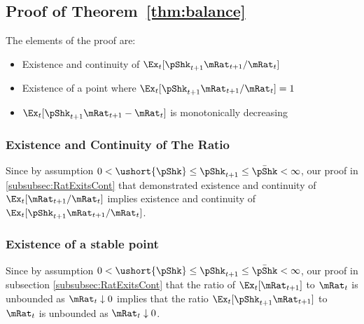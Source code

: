 \documentclass[\econtexRoot/BufferStockTheory]{subfiles}
\begin{document}
  
\subsection{Proof of Theorem~\ref{thm:balance}}

The elements of the proof are:
\begin{itemize}
\item Existence and continuity of $\Ex_{t}[\pShk_{t+1}\mRat_{t+1}/\mRat_t]$
\item Existence of a point where $\Ex_{t}[\pShk_{t+1}\mRat_{t+1}/\mRat_t] = 1$
\item $\Ex_{t}[\pShk_{t+1}\mRat_{t+1}-\mRat_{t}]$ is monotonically decreasing
\end{itemize}

\subsubsection{Existence and Continuity of The Ratio}%

Since by assumption $ 0 < \ushort{\pShk} \leq \pShk_{t+1} \leq \bar{\pShk} < \infty$, our proof in \ref{subsubsec:RatExitsCont} that demonstrated existence and continuity of $\Ex_{t}[\mRat_{t+1}/\mRat_{t}]$ implies existence and continuity of $\Ex_{t}[\pShk_{t+1}\mRat_{t+1}/\mRat_{t}]$.

\subsubsection{Existence of a stable point}

Since by assumption $ 0 < \ushort{\pShk} \leq \pShk_{t+1} \leq \bar{\pShk} < \infty$, our proof in subsection \ref{subsubsec:RatExitsCont} that the ratio of $\Ex_{t}[\mRat_{t+1}]$ to $\mRat_{t}$ is unbounded as $\mRat_{t} \downarrow 0$ implies that the ratio $\Ex_{t}[\pShk_{t+1}\mRat_{t+1}]$ to $\mRat_{t}$ is unbounded as $\mRat_{t} \downarrow 0$.
\end{document}
